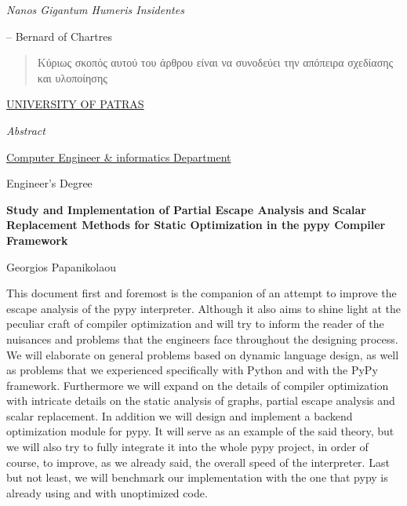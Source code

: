\documentclass[11pt, english, singlespacing, parskip, headsepline]{MastersDoctoralThesis}
\begin{document}
\noindent\textit{Nanos Gigantum Humeris Insidentes}\bigbreak

\hfill – Bernard of Chartres


\begin{abstract}

Κύριως σκοπός αυτού του άρθρου είναι να συνοδεύει την απόπειρα σχεδίασης και υλοποίησης 

\end{abstract}

\newpage\null\thispagestyle{empty}\newpage
\checktoopen
\tttypeout{\abstractname}
\null\vfil
\thispagestyle{plain}
\begin{center}
{\normalsize \MakeUppercase{\href{http://www.upatras.gr/en}{University of Patras}} \par}
\bigskip
{\huge\textit{Abstract} \par}
\bigskip
{\normalsize \href{https://www.ceid.upatras.gr/en/}{Computer Engineer \& informatics Department} \par}
\bigskip
{\normalsize Engineer's Degree\par}
\bigskip
{\normalsize\bfseries Study and Implementation of Partial Escape Analysis and Scalar Replacement Methods for Static Optimization in the pypy Compiler Framework \par}
\medskip
{\normalsize Georgios Papanikolaou \par}
\bigskip
\end{center}

This document first and foremost is the companion of an attempt to improve the
escape analysis of the pypy interpreter. Although it also aims to shine light
at the peculiar craft of compiler optimization and will try to inform the
reader of the nuisances and problems that the engineers face throughout the
designing process. We will elaborate on general problems based on dynamic
language design, as well as problems that we experienced specifically with
Python and with the PyPy framework.  Furthermore we will expand on the details
of compiler optimization with intricate details on the static analysis of
graphs, partial escape analysis and scalar replacement. In addition we will
design and implement a backend optimization module for pypy. It will serve as
an example of the said theory, but we will also try to fully integrate it into
the whole pypy project, in order of course, to improve, as we already said, the
overall speed of the interpreter. Last but not least, we will benchmark our
implementation with the one that pypy is already using and with unoptimized
code.
\end{document}
